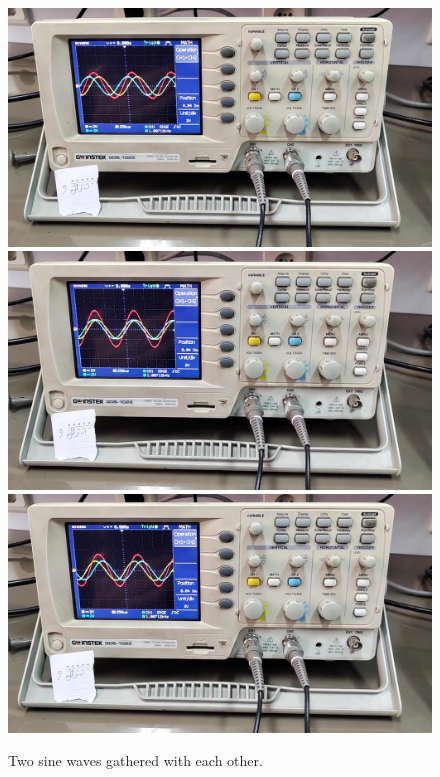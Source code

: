 \documentclass[11pt]{article}
\newcommand{\PicScale}{0.2}
\begin{document}
\begin{question}
{        \begin{figure}[H]
            \begin{center}
                \includegraphics[scale=\PicScale]{Fig/24.png}
                \includegraphics[scale=\PicScale]{Fig/25.png}
                \includegraphics[scale=\PicScale]{Fig/26.png}
                \caption{Two sine waves gathered with each other.}
            \end{center}
        \end{figure}

}
\end{question}
\end{document}
